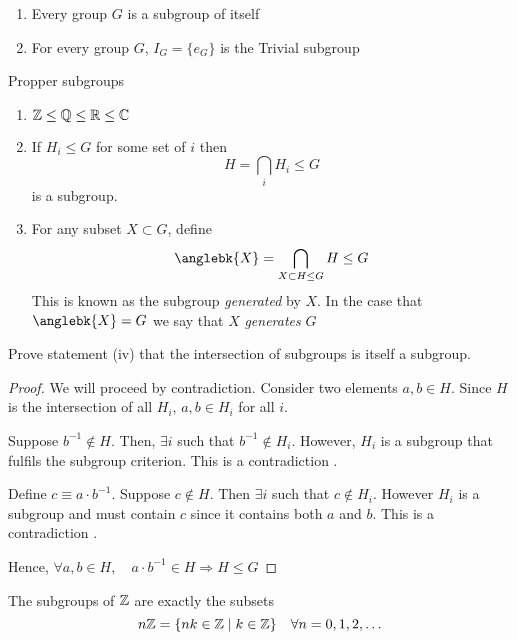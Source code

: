 \documentclass{article}
\begin{document}
\begin{eg}\leavevmode
    \begin{enumerate}
        \item Every group $G$ is a subgroup of itself
        \item For every group $G$, $I_G = \{e_G\}$ is the Trivial subgroup
    \end{enumerate}
    Propper subgroups
    \begin{enumerate}[resume]
        \item $\mathbb{Z} \leq \mathbb{Q} \leq \mathbb{R} \leq \mathbb{C}$
        \item If $H_i \leq G$ for some set of $i$ then
        \[
            H = \bigcap_{i}{H_i} \leq G   
        \]
        is a subgroup.
        \item For any subset $X \subset G$, define
        \[
            \anglebk{X} = \bigcap_{X \subset H \leq G}{H} \leq G
        \]
        This is known as the subgroup \emph{generated} by $X$. In the case that $\anglebk{X} = G$ we say that $X$ \emph{generates} $G$
    \end{enumerate}
\end{eg}

\begin{ex}
    Prove statement (iv) that the intersection of subgroups is itself a subgroup. 
\end{ex}

\begin{proof}
    We will proceed by contradiction. Consider two elements $a, b \in H$. Since $H$ is the intersection of all $H_i$, $a, b \in H_i $ for all $i$.
    
    Suppose $b^{-1} \notin H$. Then, $\exists i$ such that $b^{-1} \notin H_i$. However, $H_i$ is a subgroup that fulfils the subgroup criterion. This is a contradiction \contradiction.

    Define $c \equiv a \cdot b^{-1}$. Suppose $c \notin H$. Then $\exists i$ such that $c \notin H_i$. However $H_i$ is a subgroup and must contain $c$ since it contains both $a$ and $b$. This is a contradiction \contradiction.
    
    Hence, $\forall a,b \in H, \quad a \cdot b^{-1} \in H \Rightarrow H \leq G$
\end{proof}

\begin{prop}
    The subgroups of $\mathbb{Z}$ are exactly the subsets
    \[
        n\mathbb{Z} = \{nk \in \mathbb{Z} \mid k \in \mathbb{Z}\} \quad \forall n = 0, 1, 2, \ldots
    \]
\end{prop}

\end{document}
